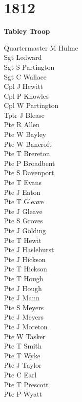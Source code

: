 \chapter*{1812}

\begin{center}
  \Large
  \textbf{Tabley Troop}
\end{center}

\begin{multicols}{2}
  \noindent
  Quartermaster M Hulme \\
  Sgt Ledward \\
  Sgt S Partington \\
  Sgt C Wallace \\
  Cpl J Hewitt \\
  Cpl P Knowles \\
  Cpl W Partington \\
  Tptr J Blease \\
  Pte R Allen \\
  Pte W Bayley \\
  Pte W Bancroft \\
  Pte T Brereton \\
  Pte P Broadbent \\
  Pte S Davenport \\
  Pte T Evans \\
  Pte J Eaton \\
  Pte T Gleave \\
  Pte J Gleave \\
  Pte S Groves \\
  Pte J Golding \\
  Pte T Hewit \\
  Pte J Haslehurst \\
  Pte J Hickson \\
  Pte T Hickson \\
  Pte T Hough \\
  Pte J Hough \\
  Pte J Mann \\
  Pte S Meyers \\
  Pte J Meyers \\
  Pte J Moreton \\
  Pte W Tasker \\
  Pte T Smith \\
  Pte T Wyke \\
  Pte J Taylor \\
  Pte C Earl \\
  Pte T Prescott \\
  Pte P Wyatt \\

\end{multicols}

